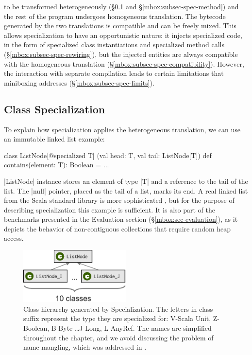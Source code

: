  to be transformed heterogeneously (\S\ref{mbox:subsec-spec-class} and \S\ref{mbox:subsec-spec-method}) and the rest of the program undergoes homogeneous translation. The bytecode generated by the two translations is compatible and can be freely mixed. This allows specialization to have an opportunistic nature: it injects specialized code, in the form of specialized class instantiations and specialized method calls (\S\ref{mbox:subsec-spec-rewiring}), but the injected entities are always compatible with the homogeneous translation (\S\ref{mbox:subsec-spec-compatibility}). However, the interaction with separate compilation leads to certain limitations that miniboxing addresses (\S\ref{mbox:subsec-spec-limits}).

\subsection{Class Specialization}
\label{mbox:subsec-spec-class}

To explain how specialization applies the heterogeneous translation, we can use an immutable linked list example:

\begin{lstlisting-nobreak}
 class ListNode[@specialized T]
          (val head: T, val tail: ListNode[T]) {
   def contains(element: T): Boolean = ...
 }
\end{lstlisting-nobreak}

 |ListNode| instance stores an element of type |T| and a reference to the tail of the list. The |null| pointer, placed as the tail of a list, marks its end. A real linked list from the Scala standard library is more sophisticated \cite{collections-alex, adriaan}, but for the purpose of describing specialization this example is sufficient. It is also part of the benchmarks presented in the Evaluation section (\S\ref{mbox:sec-evaluation}), as it depicts the behavior of non-contiguous collections that require random heap access.

\begin{figure}[t!]
    \centering
    \includegraphics[width=0.5\textwidth]{diags/spec-diag.eps}
    \vspace{-16em}
    \caption[Class hierarchy generated by Specialization]{Class hierarchy generated by Specialization. The letters in class suffix represent the type they are specialized for: V-Scala Unit, Z-Boolean, B-Byte \ldots J-Long, L-AnyRef. The names are simplified throughout the chapter, and we avoid discussing the problem of name mangling, which was addressed in \cite{iuli-thesis}.}
    \label{mbox:fig-spec-diag}
\end{figure}


